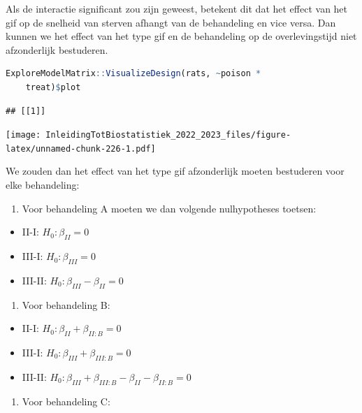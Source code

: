 \documentclass[
  12pt,dutch,coursenotes]{book}
\providecommand{\tightlist}{%
  \setlength{\itemsep}{0pt}\setlength{\parskip}{0pt}}
\begin{document}
Als de interactie significant zou zijn geweest, betekent dit dat het effect van het gif op de snelheid van sterven afhangt van de behandeling en vice versa.
Dan kunnen we het effect van het type gif en de behandeling op de overlevingstijd niet afzonderlijk bestuderen.

\begin{lstlisting}[language=R]
ExploreModelMatrix::VisualizeDesign(rats, ~poison *
    treat)$plot
\end{lstlisting}

\begin{lstlisting}
## [[1]]
\end{lstlisting}

\texttt{[image: InleidingTotBiostatistiek\_2022\_2023\_files/figure-latex/unnamed-chunk-226-1.pdf]}

We zouden dan het effect van het type gif afzonderlijk moeten bestuderen voor elke behandeling:

\begin{enumerate}
\def\labelenumi{\arabic{enumi}.}
\tightlist
\item
  Voor behandeling A moeten we dan volgende nulhypotheses toetsen:
\end{enumerate}

\begin{itemize}
\tightlist
\item
  II-I: \(H_0: \beta_{II}=0\)
\item
  III-I: \(H_0: \beta_{III}=0\)
\item
  III-II: \(H_0: \beta_{III}-\beta_{II}=0\)
\end{itemize}

\begin{enumerate}
\def\labelenumi{\arabic{enumi}.}
\setcounter{enumi}{1}
\tightlist
\item
  Voor behandeling B:
\end{enumerate}

\begin{itemize}
\tightlist
\item
  II-I: \(H_0: \beta_{II}+\beta_{II:B}=0\)
\item
  III-I: \(H_0: \beta_{III}+\beta_{III:B}=0\)
\item
  III-II: \(H_0: \beta_{III}+\beta_{III:B}-\beta_{II}-\beta_{II:B}=0\)
\end{itemize}

\begin{enumerate}
\def\labelenumi{\arabic{enumi}.}
\setcounter{enumi}{2}
\tightlist
\item
  Voor behandeling C:
\end{enumerate}
\end{document}
